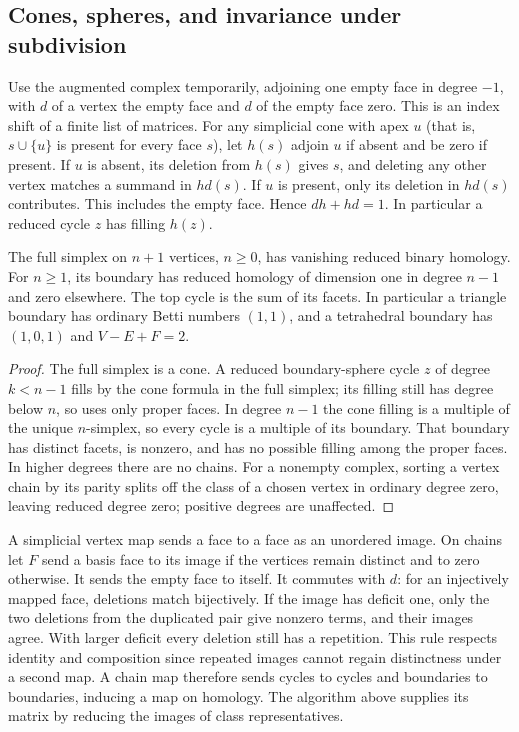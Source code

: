 \subsection{Cones, spheres, and invariance under subdivision}
Use the augmented complex temporarily, adjoining one empty face in degree
$-1$, with $d$ of a vertex the empty face and $d$ of the empty face zero.
This is an index shift of a finite list of matrices. For any simplicial
cone with apex $u$ (that is, $s\cup\{u\}$ is present for every face
$s$), let $h(s)$ adjoin $u$ if absent and be zero if present. If $u$ is
absent, its deletion from $h(s)$ gives $s$, and deleting any other vertex
matches a summand in $hd(s)$. If $u$ is present, only its deletion in
$hd(s)$ contributes. This includes the empty face. Hence
$dh+hd=1$. In particular a reduced cycle $z$ has filling $h(z)$.

\begin{theorem}\label{idx-algebraic193}
The full simplex on $n+1$ vertices, $n\ge0$, has vanishing reduced
binary homology. For $n\ge1$, its boundary has reduced homology of
dimension one in degree $n-1$ and zero elsewhere. The top cycle is the
sum of its facets. In particular a triangle boundary has ordinary Betti
numbers $(1,1)$, and a tetrahedral boundary has $(1,0,1)$ and
$V-E+F=2$.
\end{theorem}
\begin{proof}
The full simplex is a cone. A reduced boundary-sphere cycle $z$ of
degree $k<n-1$ fills by the cone formula in the full simplex; its filling
still has degree below $n$, so uses only proper faces. In degree $n-1$
the cone filling is a multiple of the unique $n$-simplex, so every
cycle is a multiple of its boundary. That boundary has distinct facets,
is nonzero, and has no possible filling among the proper faces. In
higher degrees there are no chains. For a nonempty complex, sorting a
vertex chain by its parity splits off the class of a chosen vertex in
ordinary degree zero, leaving reduced degree zero; positive degrees are
unaffected.
\end{proof}

A simplicial vertex map sends a face to a face as an unordered image. On
chains let $F$ send a basis face to its image if the vertices remain
distinct and to zero otherwise. It sends the empty face to itself.
It commutes with $d$: for an injectively mapped face, deletions match
bijectively. If the image has deficit one, only the two deletions from
the duplicated pair give nonzero terms, and their images agree. With
larger deficit every deletion still has a repetition. This rule
respects identity and composition since repeated images cannot regain
distinctness under a second map. A chain map therefore sends cycles to
cycles and boundaries to boundaries, inducing a map on homology. The
algorithm above supplies its matrix by reducing the images of class
representatives.

